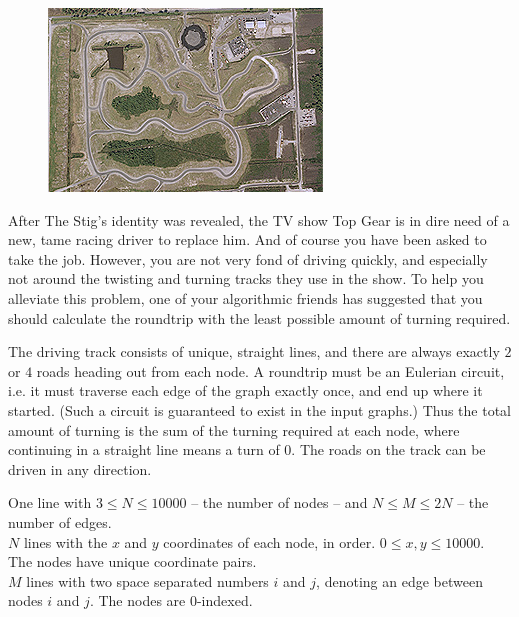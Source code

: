 
\begin{figure}
\vspace{-5mm}
\includegraphics[width=\linewidth,keepaspectratio=true]{roundtrip/roundtrip}
\vspace{-9mm}
\end{figure}

\noindent
After The Stig's identity was revealed, the TV show Top Gear is in dire need of a new, tame racing driver to replace him. And of course you have been asked to take the job. However, you are not very fond of driving quickly, and especially not around the twisting and turning tracks they use in the show. To help you alleviate this problem, one of your algorithmic friends has suggested that you should calculate the roundtrip with the least possible amount of turning required. 

The driving track consists of unique, straight lines, and there are always exactly $2$ or $4$ roads heading out from each node. A roundtrip must be an Eulerian circuit, i.e. it must traverse each edge of the graph exactly once, and end up where it started. (Such a circuit is guaranteed to exist in the input graphs.) Thus the total amount of turning is the sum of the turning required at each node, where continuing in a straight line means a turn of $0$. The roads on the track can be driven in any direction.

\Input
One line with $3 \leq N \leq 10000$ -- the number of nodes -- and $N \leq M \leq 2N$ -- the number of edges.\\
$N$ lines with the $x$ and $y$ coordinates of each node, in order. $0 \leq x, y \leq 10000$. The nodes have unique coordinate pairs.\\
$M$ lines with two space separated numbers $i$ and $j$, denoting an edge between nodes $i$ and $j$. The nodes are $0$-indexed.\\

